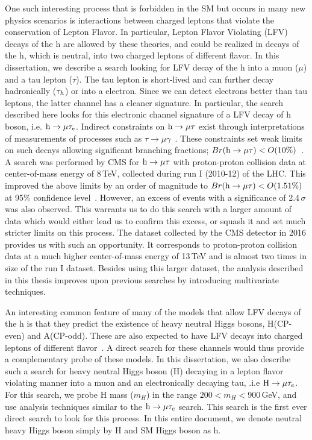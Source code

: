 One such interesting process that is forbidden in the SM but occurs in many new physics scenarios is interactions between charged leptons that violate the conservation of Lepton Flavor. In particular, Lepton Flavor Violating (LFV) decays of the h are allowed by these theories, and could be realized in decays of the h, which is neutral, into two charged leptons of different flavor. In this dissertation, we describe a search looking for LFV decay of the h into a muon ($\mu$) and a tau lepton ($\tau$). The tau lepton is short-lived and can further decay hadronically ($\tau_{h}$) or into a electron. Since we can detect electrons better than tau leptons, the latter channel has a cleaner signature. In particular, the search described here looks for this electronic channel signature of a LFV decay of h boson, i.e. $\text{h} \to \mu \tau_{e}$. Indirect constraints on $\text{h} \to \mu \tau$ exist through interpretations of measurements of processes such as $\tau \rightarrow \mu \gamma$~\cite{kanemura}. These constraints set weak limits on such decays allowing significant branching fractions; $Br(\text{h} \to \mu \tau)<O(10\%)$~\cite{Blankenburg:2012ex,Harnik:2012pb}. A search was performed by CMS for $\text{h} \to \mu \tau$ with proton-proton collision data at center-of-mass energy of 8\,TeV, collected during run I (2010-12) of the LHC. This improved the above limits by an order of magnitude to $Br(\text{h} \to \mu \tau)<O(1.51\%)$ at 95\% confidence level~\cite{Khachatryan:2015kon}. However, an excess of events with a significance of 2.4\,$\sigma$ was also observed. This warrants us to do this search with a larger amount of data which would either lead us to confirm this excess, or squash it and set much stricter limits on this process. The dataset collected by the CMS detector in 2016 provides us with such an opportunity. It corresponds to proton-proton collision data at a much higher center-of-mass energy of 13\,TeV and is almost two times in size of the run I dataset. Besides using this larger dataset, the analysis described in this thesis improves upon previous searches by introducing multivariate techniques.

An interesting common feature of many of the models that allow LFV decays of the h is that they predict the existence of heavy neutral Higgs bosons, H(CP-even) and A(CP-odd). These are also expected to have LFV decays into charged leptons of different flavor~\cite{PhysRevD.93.055021}. A direct search for these channels would thus provide a complementary probe of these models. In this dissertation, we also describe such a search for heavy neutral Higgs boson (H) decaying in a lepton flavor violating manner into a muon and an electronically decaying tau, .i.e $\text{H} \to \mu \tau_{e}$. For this search, we probe H mass ($m_H$) in the range $200<m_H<900$\,GeV, and use analysis techniques similar to the $\text{h} \to \mu \tau_{e}$ search. This search is the first ever direct search to look for this process. In this entire document, we denote neutral heavy Higgs boson simply by H and SM Higgs boson as h.

